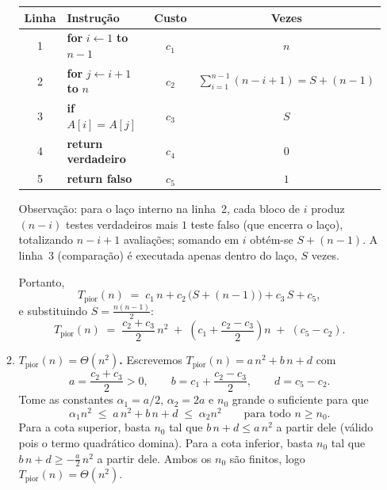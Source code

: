 \documentclass[9pt,a4paper]{extarticle}
\begin{document}
\begin{itemize}
\begin{enumerate}[label=(\alph*)]
    \begin{center}
    \renewcommand{\arraystretch}{1.15}
    \begin{tabular}{@{}clcc@{}}
        \toprule
        \textbf{Linha} & \textbf{Instrução} & \textbf{Custo} & \textbf{Vezes} \\
        \midrule
        1 & \textbf{for} $i \gets 1$ \textbf{to} $n-1$               & $c_1$ & $n$ \\
        2 & \quad \textbf{for} $j \gets i+1$ \textbf{to} $n$          & $c_2$ & $\sum_{i=1}^{n-1}(n-i+1) = S + (n-1)$ \\
        3 & \quad\quad \textbf{if} $A[i] = A[j]$                      & $c_3$ & $S$ \\
        4 & \quad\quad\quad \textbf{return verdadeiro}                & $c_4$ & $0$ \\
        5 & \textbf{return falso}                                      & $c_5$ & $1$ \\
        \bottomrule
    \end{tabular}
    \end{center}

    Observação: para o laço interno na linha~2, cada bloco de $i$ produz $(n - i)$ testes verdadeiros mais $1$ teste falso (que encerra o laço), totalizando $n - i + 1$ avaliações; somando em $i$ obtém-se $S + (n-1)$. A linha~3 (comparação) é executada apenas dentro do laço, $S$ vezes.

    Portanto,
    \[
        T_{\text{pior}}(n) \;=\; c_1\,n + c_2\,\bigl(S + (n-1)\bigr) + c_3\,S + c_5,
    \]
    e substituindo $S = \frac{n(n-1)}{2}$:
    \[
        T_{\text{pior}}(n) \;=\; \frac{c_2 + c_3}{2}\, n^2 \;+\; \left(c_1 + \frac{c_2 - c_3}{2}\right) n \;+\; (c_5 - c_2).
    \]

    \item \textbf{$T_{\text{pior}}(n) = \Theta(n^2)$.} Escrevemos $T_{\text{pior}}(n) = a\,n^2 + b\,n + d$ com
    \[
        a = \frac{c_2 + c_3}{2} > 0, \qquad b = c_1 + \frac{c_2 - c_3}{2}, \qquad d = c_5 - c_2.
    \]
    Tome as constantes $\alpha_1 = a/2$, $\alpha_2 = 2a$ e $n_0$ grande o suficiente para que
    \[
        \alpha_1 n^2 \;\leq\; a\,n^2 + b\,n + d \;\leq\; \alpha_2 n^2 \qquad \text{para todo } n \geq n_0.
    \]
    Para a cota superior, basta $n_0$ tal que $b\,n + d \leq a\,n^2$ a partir dele (válido pois o termo quadrático domina). Para a cota inferior, basta $n_0$ tal que $b\,n + d \geq -\tfrac{a}{2}\,n^2$ a partir dele. Ambos os $n_0$ são finitos, logo $T_{\text{pior}}(n) = \Theta(n^2)$.


\end{enumerate}
\end{itemize}
\end{document}
